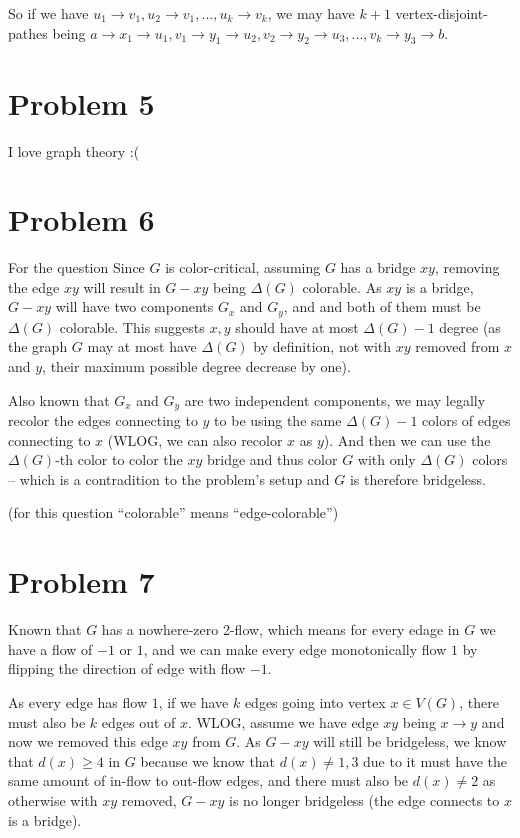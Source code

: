 \documentclass[11pt]{article}
\begin{document}
So if we have $u_1 \to v_1, u_2 \to v_1, ..., u_k \to v_k$, we may have $k+1$ vertex-disjoint-pathes being $a \to x_1 \to u_1, v_1 \to y_1 \to u_2,  v_2 \to y_2 \to u_3, ..., v_k \to y_3 \to b$.

\section*{Problem 5}
I love graph theory :(

\section*{Problem 6}

For the question Since $G$ is color-critical, assuming $G$ has a bridge $xy$, removing the edge $xy$ will result in $G-xy$ being $\Delta(G)$ colorable. As $xy$ is a bridge, $G-xy$ will have two components $G_x$ and $G_y$, and and both of them must be $\Delta(G)$ colorable. This suggests $x, y$ should have at most $\Delta(G) - 1$ degree (as the graph $G$ may at most have $\Delta(G)$ by definition, not with $xy$ removed from $x$ and $y$, their maximum possible degree decrease by one).

Also known that $G_x$ and $G_y$ are two independent components, we may legally recolor the edges connecting to $y$ to be using the same $\Delta(G) - 1$ colors of edges connecting to $x$ (WLOG, we can also recolor $x$ as $y$). And then we can use the $\Delta(G)$-th color to color the $xy$ bridge and thus color $G$ with only $\Delta(G)$ colors -- which is a contradition to the problem's setup and $G$ is therefore bridgeless.

\noindent (for this question ``colorable'' means ``edge-colorable'')

\section*{Problem 7}

Known that $G$ has a nowhere-zero 2-flow, which means for every edage in $G$ we have a flow of $-1$ or $1$, and we can make every edge monotonically flow $1$ by flipping the direction of edge with flow $-1$.

As every edge has flow $1$, if we have $k$ edges going into vertex $x \in V(G)$, there must also be $k$ edges out of $x$. WLOG, assume we have edge $xy$ being $x \to y$ and now we removed this edge $xy$ from $G$. As $G-xy$ will still be bridgeless, we know that $d(x) \geq 4$ in $G$ because we know that $d(x) \neq 1, 3$ due to it must have the same amount of in-flow to out-flow edges, and there must also be $d(x) \neq 2$ as otherwise with $xy$ removed, $G-xy$ is no longer bridgeless (the edge connects to $x$ is a bridge).
\end{document}
